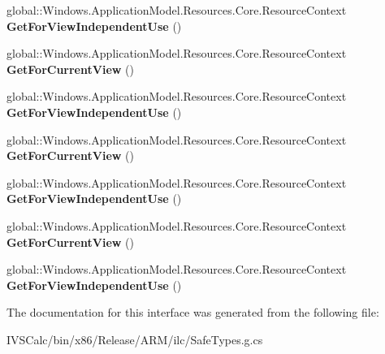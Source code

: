 \begin{DoxyCompactItemize}
global\+::\+Windows.\+Application\+Model.\+Resources.\+Core.\+Resource\+Context {\bfseries Get\+For\+View\+Independent\+Use} ()
\item 
\mbox{\label{interface_windows_1_1_application_model_1_1_resources_1_1_core_1_1_i_resource_context_statics2_a839dd450740f93fdc7662805838979a9}} 
global\+::\+Windows.\+Application\+Model.\+Resources.\+Core.\+Resource\+Context {\bfseries Get\+For\+Current\+View} ()
\item 
\mbox{\label{interface_windows_1_1_application_model_1_1_resources_1_1_core_1_1_i_resource_context_statics2_a9904808e170b450caac95f15a84950d0}} 
global\+::\+Windows.\+Application\+Model.\+Resources.\+Core.\+Resource\+Context {\bfseries Get\+For\+View\+Independent\+Use} ()
\item 
\mbox{\label{interface_windows_1_1_application_model_1_1_resources_1_1_core_1_1_i_resource_context_statics2_a839dd450740f93fdc7662805838979a9}} 
global\+::\+Windows.\+Application\+Model.\+Resources.\+Core.\+Resource\+Context {\bfseries Get\+For\+Current\+View} ()
\item 
\mbox{\label{interface_windows_1_1_application_model_1_1_resources_1_1_core_1_1_i_resource_context_statics2_a9904808e170b450caac95f15a84950d0}} 
global\+::\+Windows.\+Application\+Model.\+Resources.\+Core.\+Resource\+Context {\bfseries Get\+For\+View\+Independent\+Use} ()
\item 
\mbox{\label{interface_windows_1_1_application_model_1_1_resources_1_1_core_1_1_i_resource_context_statics2_a839dd450740f93fdc7662805838979a9}} 
global\+::\+Windows.\+Application\+Model.\+Resources.\+Core.\+Resource\+Context {\bfseries Get\+For\+Current\+View} ()
\item 
\mbox{\label{interface_windows_1_1_application_model_1_1_resources_1_1_core_1_1_i_resource_context_statics2_a9904808e170b450caac95f15a84950d0}} 
global\+::\+Windows.\+Application\+Model.\+Resources.\+Core.\+Resource\+Context {\bfseries Get\+For\+View\+Independent\+Use} ()
\end{DoxyCompactItemize}


The documentation for this interface was generated from the following file\+:\begin{DoxyCompactItemize}
\item 
I\+V\+S\+Calc/bin/x86/\+Release/\+A\+R\+M/ilc/Safe\+Types.\+g.\+cs\end{DoxyCompactItemize}
